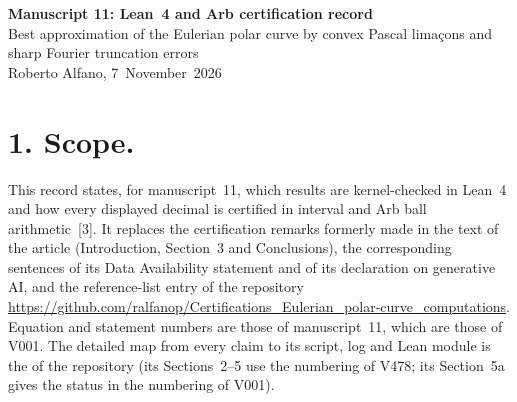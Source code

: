 \documentclass[11pt,a4paper]{article}
\newcommand{\R}{https://github.com/ralfanop/Certifications_Eulerian_polar-curve_computations}
\newcommand{\fil}[1]{\href{\R/blob/main/#1}{\texttt{\detokenize{#1}}}}
\begin{document}
\begin{center}
{\Large\bfseries Manuscript 11: Lean~4 and Arb certification record}\\[6pt]
{\large Best approximation of the Eulerian polar curve by convex Pascal lima\c{c}ons and sharp Fourier truncation errors}\\[6pt]
Roberto Alfano, 7~November~2026
\end{center}

\section*{1. Scope.}
This record states, for manuscript~11, which results are kernel-checked in Lean~4 and how every displayed decimal is certified in interval and Arb ball arithmetic~[3]. It replaces the certification remarks formerly made in the text of the article (Introduction, Section~3 and Conclusions), the corresponding sentences of its Data Availability statement and of its declaration on generative AI, and the reference-list entry of the repository \url{\R}. Equation and statement numbers are those of manuscript~11, which are those of V001. The detailed map from every claim to its script, log and Lean module is the \fil{README.md} of the repository (its Sections~2--5 use the numbering of V478; its Section~5a gives the status in the numbering of V001).
\end{document}
